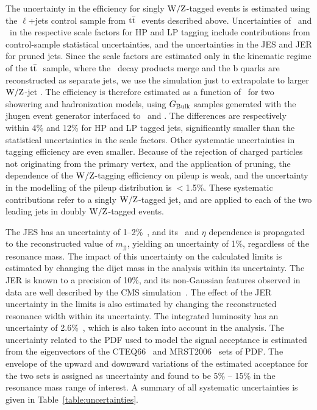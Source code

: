 The uncertainty in the efficiency for singly ${\rm W}/{\rm Z}$-tagged events
is estimated using the $\ell$+jets control sample from $\mathrm{t}\bar{\mathrm{t}}~$ events
described above. Uncertainties of \scalefactorHPu~and
\scalefactorLPu~in the respective scale factors for HP and LP tagging
include contributions from control-sample statistical uncertainties,
and the uncertainties in the JES and JER for pruned jets. Since the
scale factors are estimated only in the kinematic regime of the
$\mathrm{t}\bar{\mathrm{t}}~$ sample, where the \PW\ decay products merge and the b
quarks are reconstructed as separate jets, we use the simulation just
to extrapolate to larger ${\rm W}/{\rm Z}$-jet \pt. The efficiency is
therefore estimated as a function of \pt~for two showering and
hadronization models, using $G_\mathrm{Bulk}$ samples generated with the {\sc
  jhugen} event generator interfaced to \PYTHIA~and \HERWIG{++}. The
differences are respectively within 4\% and 12\% for HP and LP
tagged jets, significantly smaller than the statistical uncertainties
in the scale factors. Other systematic uncertainties in tagging
efficiency are even smaller. Because of the rejection of charged
particles not originating from the primary vertex, and the application
of pruning, the dependence of the ${\rm W}/{\rm Z}$-tagging efficiency on
pileup is weak, and the uncertainty in the modelling of the pileup
distribution is $<$1.5\%. These systematic contributions refer to a
singly ${\rm W}/{\rm Z}$-tagged jet, and are applied to each of the two
leading jets in doubly ${\rm W}/{\rm Z}$-tagged events.

The JES has an uncertainty of
1--2\%~\cite{JME-JINST,Collaboration:2013dp}, and its \pt~and $\eta$
dependence is propagated to the reconstructed value of
$m_\mathrm{jj}$, yielding an uncertainty of 1\%, regardless
of the resonance mass. The impact of this uncertainty on the
calculated limits is estimated by changing the dijet mass in the
analysis within its uncertainty. The JER is known to a precision of
10\%, and its non-Gaussian features observed in data are well
described by the CMS simulation~\cite{JME-JINST}. The effect of the
JER uncertainty in the limits is also estimated by changing the
reconstructed resonance width within its uncertainty. The integrated
luminosity has an uncertainty of 2.6\%~\cite{LUM-13-001}, which is
also taken into account in the analysis. The uncertainty related to
the PDF used to model the signal acceptance is estimated from the
eigenvectors of the CTEQ66~\cite{cteq} and MRST2006~\cite{mrst2006}
sets of PDF. The envelope of the upward and downward variations of the
estimated acceptance for the two sets is assigned as uncertainty and
found to be 5\% -- 15\% in the resonance mass range of interest. A
summary of all systematic uncertainties is given in
Table~\ref{table:uncertainties}.

